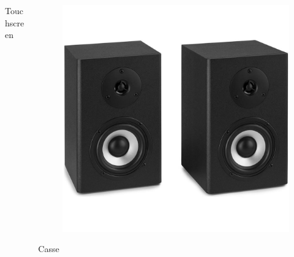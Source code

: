 \documentclass[handout]{beamer}
\begin{document}
\begin{frame}
\begin{columns}
\begin{column}{.22\textwidth}
\begin{center}
\begin{figure}
    \end{figure}
    Touchscreen
    \end{center}
\end{column}
\begin{column}{.22\textwidth}
  \begin{center} 
    \begin{figure}
      \includegraphics[width=\columnwidth]{img/casse.jpg}
    \end{figure}
    Casse
    \end{center}
\end{column}
\end{columns}
\end{frame}
\end{document}
